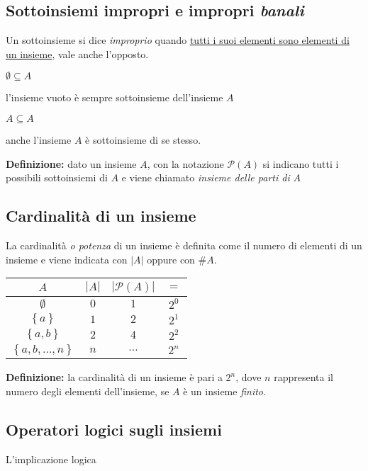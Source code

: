 \documentclass[a4paper]{article}
\newcommand{\n}{\par \noindent \newline}
\begin{document}
\subsection[Sottoinsiemi impropri]{Sottoinsiemi impropri e impropri \textit{banali}}
Un sottoinsieme si dice \textit{improprio} quando \underline{tutti i suoi elementi sono elementi di un insieme}, vale anche l'opposto.
\\
\begin{center}
	\begin{math}
		\emptyset \subseteq A
	\end{math}
\end{center}
l'insieme vuoto è sempre sottoinsieme dell'insieme $A$
\begin{center}
	\begin{math}
		A \subseteq A
	\end{math}
\end{center}
anche l'insieme $A$ è sottoinsieme di se stesso.\\
\n
\textbf{Definizione: }dato un insieme $A$, con la notazione $ \mathcal{P}(A)$ si indicano tutti i possibili sottoinsiemi di $A$ e viene chiamato \textit{insieme delle parti di }$A$
\subsection{Cardinalità di un insieme}
La cardinalità \textit{o potenza} di un insieme è definita come il numero di elementi di un insieme e viene indicata con $|A|$ oppure con $\# A$.
\begin{center}
	\begin{tabular}{|c|c|c|c|}
	\hline
	\rule[0cm]{0mm}{0.4cm}
	$A$ & $|A|$ & $|\mathcal{P}(A)|$ &$=$\\
	\hline
	\rule[0cm]{0mm}{0.4cm}
	$\emptyset$ & $0$ & $1$ &$2^0$\\
	\hline
	\rule[0cm]{0mm}{0.4cm}
	$\left\lbrace a\right\rbrace$  & $1$ & $2$ &$2^1$\\
	\hline
	\rule[0cm]{0mm}{0.4cm}
	$\left\lbrace a,b \right\rbrace$ & $2$ & $4$ & $2^2$\\
	\hline
	\rule[0cm]{0mm}{0.4cm}
	$\left\lbrace a,b,...,n \right\rbrace$ & $n$ & $...$ & $2^n$\\
	\hline
\end{tabular}
\end{center}
\textbf{Definizione: }la cardinalità di un insieme è pari a $2^n$, dove $n$ rappresenta il numero degli elementi dell'insieme, se $A$ è un insieme \textit{finito}.
\subsection{Operatori logici sugli insiemi}
L'implicazione logica
\end{document}
